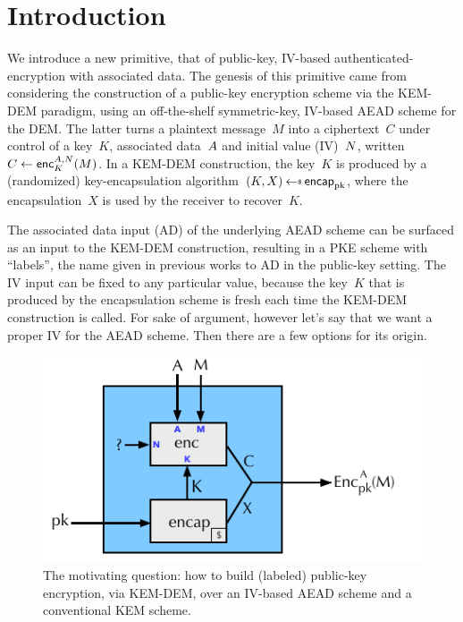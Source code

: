 \section{Introduction}
\label{sec:intro}
We introduce a new primitive, that of public-key, IV-based authenticated-encryption with associated data. The genesis of this primitive came from considering the construction of a public-key encryption scheme via the KEM-DEM paradigm, using an off-the-shelf symmetric-key, IV-based AEAD scheme for the DEM.  The latter turns a plaintext message~$M$ into a ciphertext~$C$ under control of a key~$K$, associated data~$A$ and initial value (IV)~$N$, written $C \gets {\mathsf{enc}}_{K}^{A,N}(M)$.  In a KEM-DEM construction, the key~$K$ is produced by a (randomized) key-encapsulation algorithm~$(K,X)\getsr\encap_\pk$, where the encapsulation~$X$ is used by the receiver to recover~$K$.  

The associated data input (AD) of the underlying AEAD scheme can be surfaced as an input to the KEM-DEM construction, resulting in a PKE scheme with ``labels'', the name given in previous works to AD in the public-key setting.   The IV input can be fixed to any particular value, because the key~$K$ that is produced by the encapsulation scheme is fresh each time the KEM-DEM construction is called.  For sake of argument, however let's say that we want a proper IV for the AEAD scheme.    Then there are a few options for its origin.

\begin{figure}[h]
\begin{center}
\includegraphics[scale=1.2]{kem-dem.pdf}
\caption{The motivating question: how to build (labeled) public-key encryption, via KEM-DEM, over an IV-based AEAD scheme and a conventional KEM scheme.}
\label{fig:kem-example}
\end{center}
\end{figure}

